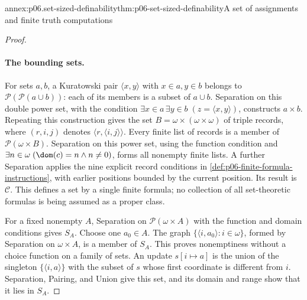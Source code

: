 \begin{annexitem}{annex:p06.set-sized-definability}{thm:p06-set-sized-definability}{A set of assignments and finite truth computations}
\begin{proof}
\paragraph{The bounding sets.}
For sets \(a,b\), a Kuratowski pair \(\langle x,y\rangle\) with
\(x\in a,y\in b\) belongs to \(\mathcal{P}(\mathcal{P}(a\cup b))\): each
of its members is a subset of \(a\cup b\).  Separation on this
double power set, with the condition
\(\exists x\in a\,\exists y\in b\;(z=\langle x,y\rangle)\),
constructs \(a\times b\).  Repeating this construction gives the
set \(B=\omega\times(\omega\times\omega)\) of triple records,
where \((r,i,j)\) denotes \(\langle r,\langle i,j\rangle\rangle\).
Every finite list of records is a member of
\(\mathcal{P}(\omega\times B)\).  Separation on this power set, using
the function condition and
\(\exists n\in\omega\;(\dom(c)=n\land n\ne0)\), forms all
nonempty finite lists.  A further Separation applies the nine
explicit record conditions in
\cref{def:p06-finite-formula-instructions}, with earlier positions
bounded by the current position.  Its result is \(\mathcal C\).
This defines a set by a single finite formula; no collection of
all set-theoretic formulas is being assumed as a proper class.

For a fixed nonempty \(A\), Separation on \(\mathcal{P}(\omega\times A)\)
with the function and domain conditions gives \(S_A\).
Choose one \(a_0\in A\).  The graph
\(\{\langle i,a_0\rangle:i\in\omega\}\), formed by Separation
on \(\omega\times A\), is a member of \(S_A\).
This proves nonemptiness without a choice function on a family of
sets.  An update \(s[i\mapsto a]\) is the union of the singleton
\(\{\langle i,a\rangle\}\) with the subset of \(s\) whose first
coordinate is different from \(i\).  Separation, Pairing, and
Union give this set, and its domain and range show that it lies
in \(S_A\).


\end{proof}
\end{annexitem}
